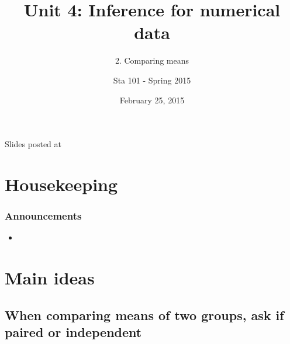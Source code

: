 \documentclass[slidestop,compress,mathserif,12pt,t,professionalfonts,xcolor=table]{beamer}
\title{Unit 4: Inference for numerical data}
\subtitle{2. Comparing means}
\author{Sta 101 - Spring 2015}
\date{February 25, 2015}
\institute{Duke University, Department of Statistical Science}
\begin{document}


\begin{frame}[plain]

\titlepage
\vfill
{\scriptsize {} \hfill Slides posted at  \webLink{\CourseSite}{\CourseSite}}
\addtocounter{framenumber}{-1} 

\end{frame}


\section{Housekeeping}


\begin{frame}
\frametitle{Announcements}

\begin{itemize}

\item 

\end{itemize}

\end{frame}


\section{Main ideas}


\subsection{When comparing means of two groups, ask if paired or independent}
\label{mi1}

\end{document}
